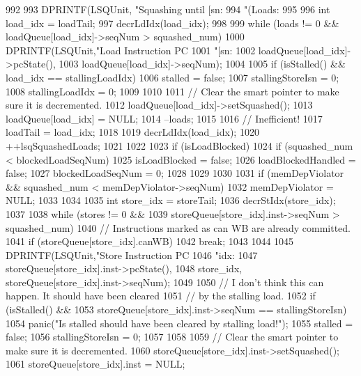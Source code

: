 \begin{DoxyCode}
992 {
993     DPRINTF(LSQUnit, "Squashing until [sn:%
994             "(Loads:%
995 
996     int load_idx = loadTail;
997     decrLdIdx(load_idx);
998 
999     while (loads != 0 && loadQueue[load_idx]->seqNum > squashed_num) {
1000         DPRINTF(LSQUnit,"Load Instruction PC %
1001                 "[sn:%
1002                 loadQueue[load_idx]->pcState(),
1003                 loadQueue[load_idx]->seqNum);
1004 
1005         if (isStalled() && load_idx == stallingLoadIdx) {
1006             stalled = false;
1007             stallingStoreIsn = 0;
1008             stallingLoadIdx = 0;
1009         }
1010 
1011         // Clear the smart pointer to make sure it is decremented.
1012         loadQueue[load_idx]->setSquashed();
1013         loadQueue[load_idx] = NULL;
1014         --loads;
1015 
1016         // Inefficient!
1017         loadTail = load_idx;
1018 
1019         decrLdIdx(load_idx);
1020         ++lsqSquashedLoads;
1021     }
1022 
1023     if (isLoadBlocked) {
1024         if (squashed_num < blockedLoadSeqNum) {
1025             isLoadBlocked = false;
1026             loadBlockedHandled = false;
1027             blockedLoadSeqNum = 0;
1028         }
1029     }
1030 
1031     if (memDepViolator && squashed_num < memDepViolator->seqNum) {
1032         memDepViolator = NULL;
1033     }
1034 
1035     int store_idx = storeTail;
1036     decrStIdx(store_idx);
1037 
1038     while (stores != 0 &&
1039            storeQueue[store_idx].inst->seqNum > squashed_num) {
1040         // Instructions marked as can WB are already committed.
1041         if (storeQueue[store_idx].canWB) {
1042             break;
1043         }
1044 
1045         DPRINTF(LSQUnit,"Store Instruction PC %
1046                 "idx:%
1047                 storeQueue[store_idx].inst->pcState(),
1048                 store_idx, storeQueue[store_idx].inst->seqNum);
1049 
1050         // I don't think this can happen.  It should have been cleared
1051         // by the stalling load.
1052         if (isStalled() &&
1053             storeQueue[store_idx].inst->seqNum == stallingStoreIsn) {
1054             panic("Is stalled should have been cleared by stalling load!\n");
1055             stalled = false;
1056             stallingStoreIsn = 0;
1057         }
1058 
1059         // Clear the smart pointer to make sure it is decremented.
1060         storeQueue[store_idx].inst->setSquashed();
1061         storeQueue[store_idx].inst = NULL;
}}
\end{DoxyCode}
